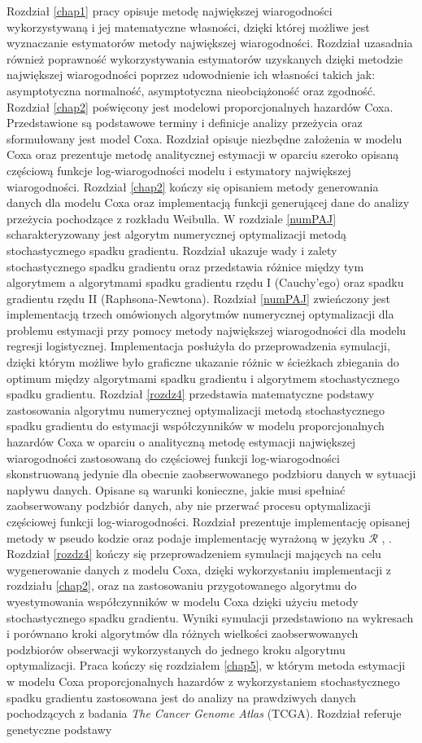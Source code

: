 Rozdział \ref{chap1} pracy opisuje metodę największej wiarogodności wykorzystywaną i jej matematyczne własności, dzięki której możliwe jest wyznaczanie estymatorów metody największej wiarogodności. Rozdział uzasadnia również poprawność wykorzystywania estymatorów uzyskanych dzięki metodzie największej wiarogodności poprzez udowodnienie ich własności takich jak: asymptotyczna normalność, asymptotyczna nieobciążoność oraz zgodność. Rozdział \ref{chap2} poświęcony jest modelowi proporcjonalnych hazardów Coxa. Przedstawione są podstawowe terminy i definicje analizy przeżycia oraz sformułowany jest model Coxa. Rozdział opisuje niezbędne założenia w modelu Coxa oraz prezentuje metodę analitycznej estymacji w oparciu szeroko opisaną częściową funkcje log-wiarogodności modelu i estymatory największej wiarogodności. Rozdział \ref{chap2} kończy się opisaniem metody generowania danych dla modelu Coxa oraz implementacją funkcji generującej dane do analizy przeżycia pochodzące z rozkładu Weibulla. W rozdziale \ref{numPAJ} scharakteryzowany jest algorytm numerycznej optymalizacji metodą stochastycznego spadku gradientu. Rozdział ukazuje wady i zalety stochastycznego spadku gradientu oraz przedstawia różnice między tym algorytmem a algorytmami spadku gradientu rzędu I (Cauchy'ego) oraz spadku gradientu rzędu II (Raphsona-Newtona). Rozdział \ref{numPAJ} zwieńczony jest implementacją trzech omówionych algorytmów numerycznej optymalizacji dla problemu estymacji przy pomocy metody największej wiarogodności dla modelu regresji logistycznej. Implementacja posłużyła do przeprowadzenia symulacji, dzięki którym możliwe było graficzne ukazanie różnic w ścieżkach zbiegania do optimum między algorytmami spadku gradientu i algorytmem stochastycznego spadku gradientu. Rozdział \ref{rozdz4} przedstawia matematyczne podstawy zastosowania algorytmu numerycznej optymalizacji metodą stochastycznego spadku gradientu do estymacji współczynników w modelu proporcjonalnych hazardów Coxa w oparciu o analityczną metodę estymacji największej wiarogodności zastosowaną do częściowej funkcji log-wiarogodności skonstruowaną jedynie dla obecnie zaobserwowanego podzbioru danych w sytuacji napływu danych. Opisane są warunki konieczne, jakie musi spełniać zaobserwowany podzbiór danych, aby nie przerwać procesu optymalizacji częściowej funkcji log-wiarogodności. Rozdział prezentuje implementację opisanej metody w pseudo kodzie oraz podaje implementację wyrażoną w języku $\mathcal{R}$ \cite{programikr}, \cite{biecek1}. Rozdział \ref{rozdz4} kończy się przeprowadzeniem symulacji mających na celu wygenerowanie danych z modelu Coxa, dzięki wykorzystaniu implementacji z rozdziału \ref{chap2}, oraz na zastosowaniu przygotowanego algorytmu do wyestymowania współczynników w modelu Coxa dzięki użyciu metody stochastycznego spadku gradientu. Wyniki symulacji przedstawiono na wykresach i porównano kroki algorytmów dla różnych wielkości zaobserwowanych podzbiorów obserwacji wykorzystanych do jednego kroku algorytmu optymalizacji. Praca kończy się rozdziałem \ref{chap5}, w którym metoda estymacji w modelu Coxa proporcjonalnych hazardów z wykorzystaniem stochastycznego spadku gradientu zastosowana jest do analizy na prawdziwych danych pochodzących z badania \textit{The Cancer Genome Atlas} (TCGA). Rozdział referuje genetyczne podstawy 
